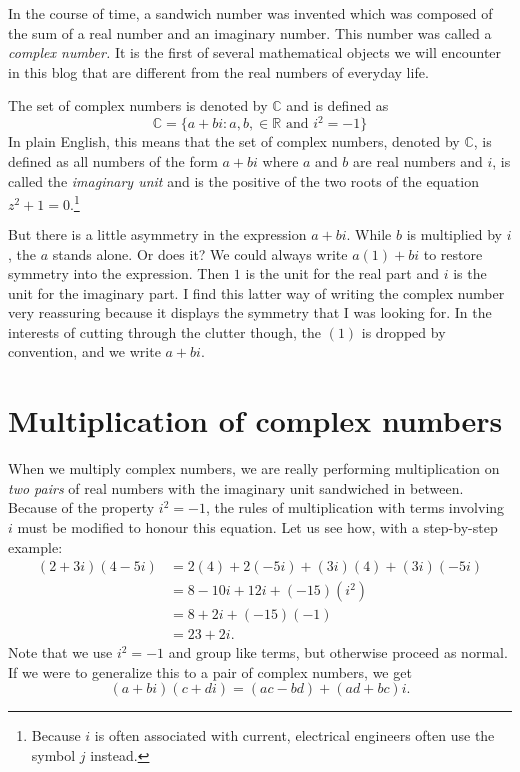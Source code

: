 \documentclass[
  a4paper,
]{article}
\begin{document}
In the course of time, a sandwich number was invented which was composed
of the sum of a real number and an imaginary number. This number was
called a \emph{complex number.} It is the first of several mathematical
objects we will encounter in this blog that are different from the real
numbers of everyday life.

The set of complex numbers is denoted by \(\mathbb{C}\) and is defined
as \[
\mathbb{C} = \{a+bi: a, b, \in \mathbb{R} \text{ and } i^2 = -1\}
\] In plain English, this means that the set of complex numbers, denoted
by \(\mathbb{C}\), is defined as all numbers of the form \(a + bi\)
where \(a\) and \(b\) are real numbers and \(i\), is called the
\emph{imaginary unit} and is the positive of the two roots of the
equation \(z^2 + 1 = 0.\)\footnote{Because \(i\) is often associated
  with current, electrical engineers often use the symbol \(j\) instead.}

But there is a little asymmetry in the expression \(a + bi\). While
\(b\) is multiplied by \(i\), the \(a\) stands alone. Or does it? We
could always write \(a(1) + bi\) to restore symmetry into the
expression. Then \(1\) is the unit for the real part and \(i\) is the
unit for the imaginary part. I find this latter way of writing the
complex number very reassuring because it displays the symmetry that I
was looking for. In the interests of cutting through the clutter though,
the \((1)\) is dropped by convention, and we write \(a + bi\).

\hypertarget{multiplication-of-complex-numbers}{%
\section{Multiplication of complex
numbers}\label{multiplication-of-complex-numbers}}

When we multiply complex numbers, we are really performing
multiplication on \emph{two pairs} of real numbers with the imaginary
unit sandwiched in between. Because of the property \(i^2 = -1\), the
rules of multiplication with terms involving \(i\) must be modified to
honour this equation. Let us see how, with a step-by-step example: \[
\begin{aligned}
(2 + 3i)(4 - 5i) & = 2(4) + 2(-5i) + (3i)(4) + (3i)(-5i)\\
& = 8 - 10i + 12i + (-15)(i^2)\\
& = 8 + 2i + (-15)(-1)\\
& = 23 + 2i.
\end{aligned}
\] Note that we use \(i^2 = -1\) and group like terms, but otherwise
proceed as normal. If we were to generalize this to a pair of complex
numbers, we get \[(a + bi)(c + di) = (ac - bd) + (ad + bc)i.\]
\end{document}
